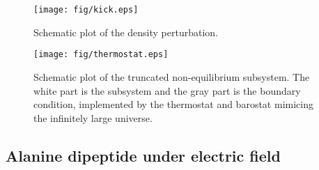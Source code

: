 \documentclass[aip,jcp,a4paper,reprint,onecolumn]{revtex4-1}
\begin{document}
\begin{figure}
  \centering
  \texttt{[image: fig/kick.eps]}
  \caption{Schematic plot of the density perturbation.}
  \label{fig:tmp1}
\end{figure}

\begin{figure}
  \centering
  \texttt{[image: fig/thermostat.eps]}
  \caption{Schematic plot of the truncated non-equilibrium subsystem.
    The white part is the subsystem and the gray part is the boundary
    condition, implemented by the thermostat and barostat mimicing
    the infinitely large universe.}
  \label{fig:tmp2}
\end{figure}


\subsection{Alanine dipeptide under electric field}
\end{document}

